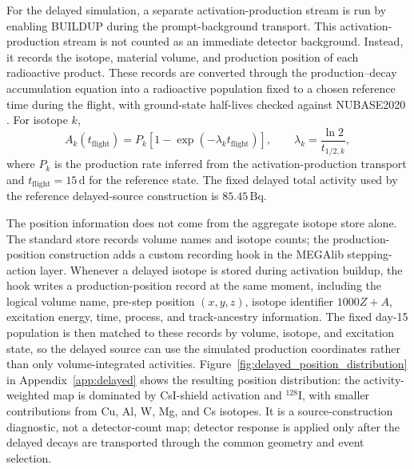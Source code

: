 \documentclass[11pt]{article}
\begin{document}
For the delayed simulation, a separate activation-production stream is run by
enabling BUILDUP during the prompt-background transport. This
activation-production stream is not counted as an immediate detector background.
Instead, it records the isotope, material volume, and production position of
each radioactive product. These records are converted through the
production--decay accumulation equation into a radioactive population fixed to a
chosen reference time during the flight, with ground-state half-lives checked
against NUBASE2020 \cite{Kondev2021NUBASE}. For isotope $k$,
\begin{equation}
  A_k(t_{\mathrm{flight}}) = P_k\left[1-\exp\left(-\lambda_k t_{\mathrm{flight}}\right)\right],
  \qquad \lambda_k = \frac{\ln 2}{t_{1/2,k}},
\end{equation}
where $P_k$ is the production rate inferred from the activation-production
transport and $t_{\mathrm{flight}}=15\,\mathrm{d}$ for the reference state.
The fixed delayed total activity used by the reference delayed-source
construction is $85.45\,\mathrm{Bq}$.

The position information does not come from the aggregate isotope store alone.
The standard store records volume names and isotope counts; the
production-position construction adds a custom recording hook in the MEGAlib
stepping-action layer. Whenever a delayed isotope is stored during activation
buildup, the hook writes a production-position record at the same moment,
including the logical volume name, pre-step position $(x,y,z)$, isotope
identifier $1000Z+A$, excitation energy, time, process, and track-ancestry
information. The fixed day-15 population is then matched to these records by
volume, isotope, and excitation state, so the delayed source can use the
simulated production coordinates rather than only volume-integrated activities.
Figure~\ref{fig:delayed_position_distribution} in Appendix~\ref{app:delayed}
shows the resulting position distribution: the activity-weighted map is
dominated by CsI-shield activation and $^{128}$I, with smaller contributions
from Cu, Al, W, Mg, and Cs isotopes. It is a source-construction diagnostic,
not a detector-count map; detector response is applied only after the delayed
decays are transported through the common geometry and event selection.
\end{document}
